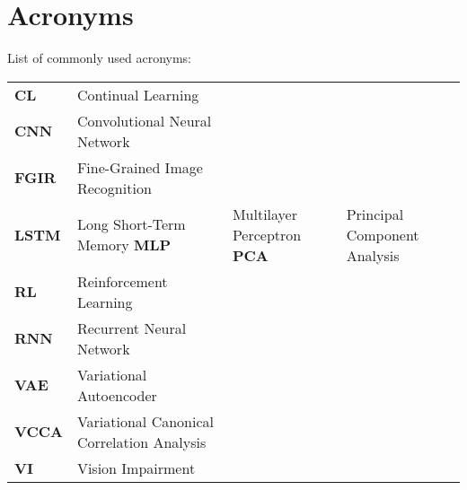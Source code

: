 
\chapter{Acronyms}
\label{chap:acronyms}

List of commonly used acronyms: \\

\begin{tabular}{llll}
	\textbf{CL}			& 	Continual Learning \\
	\textbf{CNN}		& 	Convolutional Neural Network \\
	\textbf{FGIR}		& 	Fine-Grained Image Recognition \\
	\textbf{LSTM}       &   Long Short-Term Memory
	\textbf{MLP}        &   Multilayer Perceptron
	\textbf{PCA}		& 	Principal Component Analysis \\
	\textbf{RL}			& 	Reinforcement Learning \\
	\textbf{RNN}		& 	Recurrent Neural Network \\
	\textbf{VAE}		&	Variational Autoencoder \\
	\textbf{VCCA}		&	Variational Canonical Correlation Analysis \\
	\textbf{VI} 		&	Vision Impairment \\
\end{tabular}